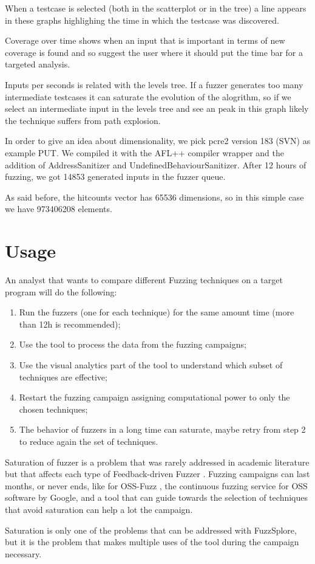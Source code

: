 \documentclass[conference,compsoc]{IEEEtran}
\begin{document}
When a testcase is selected (both in the scatterplot or in the tree) a line appears in these graphs highlighing the time in which the testcase was discovered.

Coverage over time shows when an input that is important in terms of new coverage is found and so suggest the user where it should put the time bar for a targeted analysis.

Inputs per seconds is related with the levels tree. If a fuzzer generates too many intermediate testcases it can saturate the evolution of the alogrithm, so if we select an intermediate input in the levels tree and see an peak in this graph likely the technique suffers from path explosion.

In order to give an idea about dimensionality, we pick pcre2 version 183 (SVN) as example PUT. We compiled it with the AFL++ compiler wrapper and the addition of AddressSanitizer and UndefinedBehaviourSanitizer. After 12 hours of fuzzing, we got 14853 generated inputs in the fuzzer queue.

As said before, the hitcounts vector has 65536 dimensions, so in this simple case we have 973406208 elements.

\section{Usage}

An analyst that wants to compare different Fuzzing techniques on a target program will do the following:

\begin{enumerate}
\item Run the fuzzers (one for each technique) for the same amount time (more than 12h is recommended);
\item Use the tool to process the data from the fuzzing campaigns;
\item Use the visual analytics part of the tool to understand which subset of techniques are effective;
\item Restart the fuzzing campaign assigning computational power to only the chosen techniques;
\item The behavior of fuzzers in a long time can saturate, maybe retry from step 2 to reduce again the set of techniques.
\end{enumerate}

Saturation of fuzzer is a problem that was rarely addressed in academic literature but that affects each type of Feedback-driven Fuzzer \cite{saturation}.
Fuzzing campaigns can last months, or never ends, like for OSS-Fuzz \cite{serebryany2017oss}, the continuous fuzzing service for OSS software by Google, and a tool that can guide towards the selection of techniques that avoid saturation can help a lot the campaign.

Saturation is only one of the problems that can be addressed with {\sc FuzzSplore}, but it is the problem that makes multiple uses of the tool during the campaign necessary.
\fi



\end{document}
